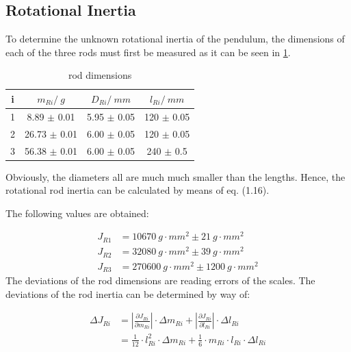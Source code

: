     \subsection{Rotational Inertia}
        To determine the unknown rotational inertia of the pendulum, the dimensions of each of the three rods must first be measured
        as it can be seen in \cref{rod dimensions}.\par
        \begin{table}[H]
            \centering
            \caption{rod dimensions}
            \label{rod dimensions}
            \begin{tabular}{|c|c|c|c|}
                \hline
                i & $ m_{Ri} / \SI{}{g} $ & $ D_{Ri} / \SI{}{mm} $ & $ l_{Ri} / \SI{}{mm} $ \\
                \hline
                \hline
                1 & 8.89 $\pm$ 0.01 & 5.95 $\pm$ 0.05 & 120 $\pm$ 0.05 \\
                \hline
                2 & 26.73 $\pm$ 0.01 & 6.00 $\pm$ 0.05 & 120 $\pm$ 0.05 \\
                \hline
                3 & 56.38 $\pm$ 0.01 & 6.00 $\pm$ 0.05 & 240 $\pm$ 0.5 \\
                \hline
            \end{tabular}
        \end{table}
        Obviously, the diameters all are much much smaller than the lengths. Hence, the rotational rod inertia can be calculated
        by means of eq. (1.16).\par
        The following values are obtained:\par
        \begin{align}
            J_{R1}  &=\SI{10670}{g\cdot mm^2} \pm \SI{21}{g\cdot mm^2}\\
            J_{R2}  &=\SI{32080}{g\cdot mm^2} \pm \SI{39}{g\cdot mm^2}\\
            J_{R3}  &=\SI{270600}{g\cdot mm^2} \pm \SI{1200}{g\cdot mm^2}
        \end{align}
        The deviations of the rod dimensions are reading errors of the scales. The deviations of the rod inertia can be determined by way of:\par
        \begin{align}
            \Delta J_{Ri}   &=\left| \frac{\partial J_{Ri}}{\partial m_{Ri}} \right| \cdot \Delta m_{Ri} + \left| \frac{\partial J_{Ri}}{\partial l_{Ri}} \right| \cdot \Delta l_{Ri} \nonumber\\
                            &=\frac{1}{12}\cdot l_{Ri}^2\cdot \Delta m_{Ri} + \frac{1}{6}\cdot m_{Ri}\cdot l_{Ri}\cdot \Delta l_{Ri}
        \end{align}
